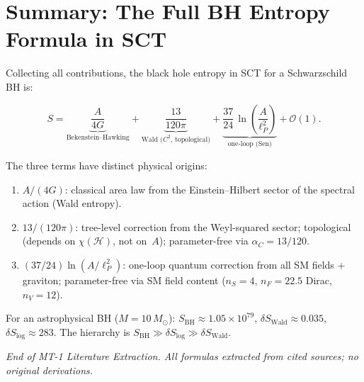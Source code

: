 \documentclass[12pt,a4paper]{article}
\theoremstyle{definition}
\theoremstyle{remark}
\begin{document}
\section{Summary: The Full BH Entropy Formula in SCT}
\label{sec:summary}

Collecting all contributions, the black hole entropy in SCT for a
Schwarzschild BH is:

\begin{tcolorbox}[colback=blue!5!white, colframe=blue!50!black,
  title={\textbf{MT-1 Main Formula (to be verified)}}]
\begin{equation}\label{eq:full-entropy}
  S = \underbrace{\frac{A}{4G}}_{\text{Bekenstein--Hawking}}
  + \underbrace{\frac{13}{120\pi}}_{\text{Wald ($C^2$, topological)}}
  + \underbrace{\frac{37}{24}\,
    \ln\!\left(\frac{A}{\ell_P^2}\right)}_{\text{one-loop (Sen)}}
  + \mathcal{O}(1).
\end{equation}
\end{tcolorbox}

\noindent
The three terms have distinct physical origins:
\begin{enumerate}[nosep]
  \item \textbf{$A/(4G)$}: classical area law from the
    Einstein--Hilbert sector of the spectral action (Wald entropy).
  \item \textbf{$13/(120\pi)$}: tree-level correction from the
    Weyl-squared sector; topological (depends on $\chi(\mathcal{H})$,
    not on~$A$); parameter-free via $\alpha_C = 13/120$.
  \item \textbf{$(37/24)\ln(A/\ell_P^2)$}: one-loop quantum
    correction from all SM fields + graviton; parameter-free via
    SM field content ($n_S = 4$, $n_F = 22.5$ Dirac, $n_V = 12$).
\end{enumerate}

For an astrophysical BH ($M = 10\,M_\odot$):
$S_{\mathrm{BH}} \approx 1.05 \times 10^{79}$,
$\delta S_{\mathrm{Wald}} \approx 0.035$,
$\delta S_{\mathrm{log}} \approx 283$.
The hierarchy is $S_{\mathrm{BH}} \gg \delta S_{\mathrm{log}} \gg
\delta S_{\mathrm{Wald}}$.

\vfill
\begin{center}
\small\textit{End of MT-1 Literature Extraction.
All formulas extracted from cited sources; no original derivations.}
\end{center}
\end{document}
